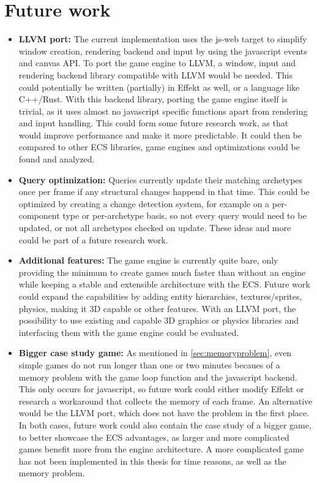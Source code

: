\section*{Future work}

\begin{itemize}
\item[] \textbf{LLVM port:} The current implementation uses the \textsf{js-web} target to simplify window creation, rendering backend and input by using the javascript events and canvas API. To port the game engine to LLVM, a window, input and rendering backend library compatible with LLVM would be needed. This could potentially be written (partially) in Effekt as well, or a language like C++/Rust. With this backend library, porting the game engine itself is trivial, as it uses almost no javascript specific functions apart from rendering and input handling. This could form some future research work, as that would improve performance and make it more predictable. It could then be compared to other ECS libraries, game engines and optimizations could be found and analyzed.
\item[] \textbf{Query optimization:} Queries currently update their matching archetypes once per frame if any structural changes happend in that time. This could be optimized by creating a change detection system, for example on a per-component type or per-archetype basis, so not every query would need to be updated, or not all archetypes checked on update. These ideas and more could be part of a future research work.
\item[] \textbf{Additional features:} The game engine is currently quite bare, only providing the minimum to create games much faster than without an engine while keeping a stable and extensible architecture with the ECS. Future work could expand the capabilities by adding entity hierarchies, textures/sprites, physics, making it 3D capable or other features. With an LLVM port, the possibility to use existing and capable 3D graphics or physics libraries and interfacing them with the game engine could be evaluated.
\item[] \textbf{Bigger case study game:} As mentioned in \cref{sec:memoryproblem}, even simple games do not run longer than one or two minutes becaues of a memory problem with the game loop function and the javascript backend. This only occurs for javascript, so future work could either modify Effekt or research a workaround that collects the memory of each frame. An alternative would be the LLVM port, which does not have the problem in the first place. In both cases, future work could also contain the case study of a bigger game, to better showcase the ECS advantages, as larger and more complicated games benefit more from the engine architecture. A more complicated game has not been implemented in this thesis for time reasons, as well as the memory problem.
\end{itemize}


